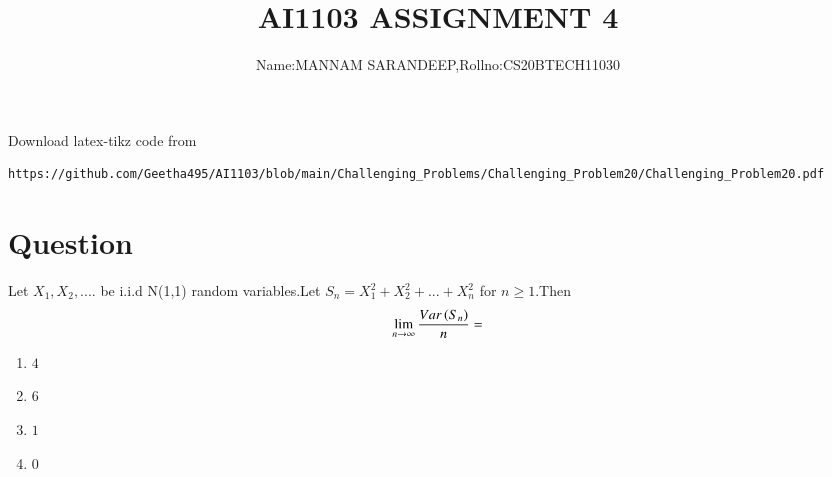 \documentclass[journal,12pt,twocolumn]{IEEEtran}
\begin{document}
     \def\rightbox#1{\makebox[0in][r]{#1}}
     \def\centbox#1{\makebox[0in]{#1}}
     \def\topbox#1{\raisebox{-\baselineskip}[0in][0in]{#1}}
     \def\midbox#1{\raisebox{-0.5\baselineskip}[0in][0in]{#1}}
\vspace{3cm}
\title{AI1103 ASSIGNMENT 4}
\author{Name:MANNAM SARANDEEP,Rollno:CS20BTECH11030}
\maketitle
\newpage
\bigskip
\renewcommand{\thefigure}{\theenumi}
\renewcommand{\thetable}{\theenumi}
\newcommand{\dsum}{\displaystyle\sum}
\newcommand{\R}{\mathbb{R}}
\newcommand{\C}{\mathbb{C}}
Download  latex-tikz code from 
%
\begin{lstlisting}
https://github.com/Geetha495/AI1103/blob/main/Challenging_Problems/Challenging_Problem20/Challenging_Problem20.pdf\end{lstlisting}

\section{Question}
Let $X_{1},X_{2},....$ be i.i.d N(1,1) random variables.Let $S_{n}=X_{1}^{2}+X_{2}^2+...+X_{n}^{2}$ for $n\ge1$.Then $$\lim_{n \to \infty}{\frac{Var\left(S_{n}\right)}{n}}=$$
\begin{enumerate}[label = (\Alph*)]
\item  $4$
\item  $6$
\item  $1$
\item  $0$
\end{enumerate}
\end{document}
